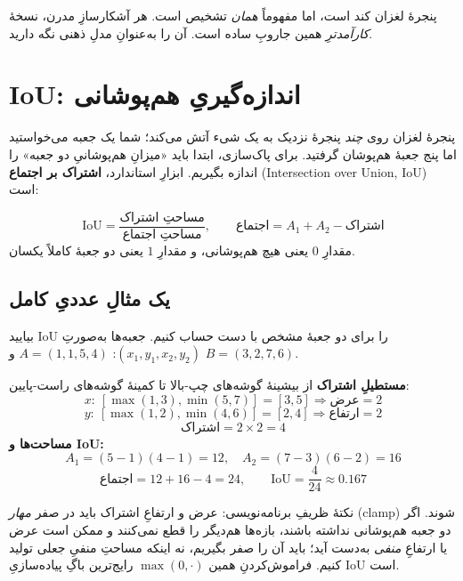 \documentclass[12pt,a4paper]{article}
\begin{document}
\begin{yaddasht}
پنجرهٔ لغزان کند است، اما مفهوماً \emph{همان} تشخیص است. هر آشکارسازِ مدرن، نسخهٔ \emph{کارآمدترِ} همین جاروبِ ساده است. آن را به‌عنوانِ مدلِ ذهنی نگه دارید.
\end{yaddasht}

\section{IoU: اندازه‌گیریِ هم‌پوشانی}

پنجرهٔ لغزان روی \emph{چند} پنجرهٔ نزدیک به یک شیء آتش می‌کند؛ شما یک جعبه می‌خواستید اما پنج جعبهٔ هم‌پوشان گرفتید. برای پاک‌سازی، ابتدا باید «میزانِ هم‌پوشانیِ دو جعبه» را اندازه بگیریم. ابزارِ استاندارد، \textbf{اشتراک بر اجتماع} (Intersection over Union, IoU) است:

\begin{riyazi}
\[
\text{IoU} = \frac{\text{مساحتِ اشتراک}}{\text{مساحتِ اجتماع}}, \qquad \text{اجتماع}=A_1+A_2-\text{اشتراک}
\]
مقدارِ $0$ یعنی هیچ هم‌پوشانی، و مقدارِ $1$ یعنی دو جعبهٔ کاملاً یکسان.
\end{riyazi}

\subsection{یک مثالِ عددیِ کامل}

بیایید IoU را برای دو جعبهٔ مشخص با دست حساب کنیم. جعبه‌ها به‌صورتِ $(x_1,y_1,x_2,y_2)$: $A=(1,1,5,4)$ و $B=(3,2,7,6)$.

\begin{riyazi}
\textbf{مستطیلِ اشتراک} از بیشینهٔ گوشه‌های چپ-بالا تا کمینهٔ گوشه‌های راست-پایین:
\[
x:\ [\max(1,3),\min(5,7)] = [3,5] \Rightarrow \text{عرض}=2
\]
\[
y:\ [\max(1,2),\min(4,6)] = [2,4] \Rightarrow \text{ارتفاع}=2
\]
\[
\text{اشتراک}=2\times2=4
\]
\textbf{مساحت‌ها و IoU:}
\[
A_1=(5{-}1)(4{-}1)=12,\quad A_2=(7{-}3)(6{-}2)=16
\]
\[
\text{اجتماع}=12+16-4=24,\qquad \text{IoU}=\frac{4}{24}\approx 0.167
\]
\end{riyazi}

\begin{nokte}
نکتهٔ ظریفِ برنامه‌نویسی: عرض و ارتفاعِ اشتراک باید در صفر \emph{مهار} (clamp) شوند. اگر دو جعبه هم‌پوشانی نداشته باشند، بازه‌ها هم‌دیگر را قطع نمی‌کنند و ممکن است عرض یا ارتفاعِ \emph{منفی} به‌دست آید؛ باید آن را صفر بگیریم، نه اینکه مساحتِ منفیِ جعلی تولید کنیم. فراموش‌کردنِ همین $\max(0,\cdot)$ رایج‌ترین باگِ پیاده‌سازیِ IoU است.
\end{nokte}
\end{document}
